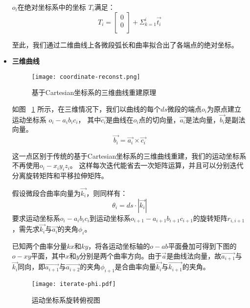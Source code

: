 \begin{itemize}
$o_i$在绝对坐标系中的坐标 $T_i$满足：
    \begin{equation}
    T_i = \left[
    		\begin{matrix}
        0\\
        0\\
      	\end{matrix}
      \right]
      + \Sigma_{k=1} ^ {i} \vec{t_i}
    \end{equation}
    
至此，我们通过二维曲线上各微段弧长和曲率拟合出了各端点的绝对坐标。

\item \textbf{三维曲线} \\

\begin{figure}[H]
\centering
\texttt{[image: coordinate-reconst.png]}
\caption{基于Cartesian坐标系的三维曲线重建原理}
\label{fig:coordinate-reconst} 
\end{figure}


如图 ~\ref{fig:coordinate-reconst} 所示，在三维情况下，我们以曲线的每个$ds$微段的端点$o_i$为原点建立运动坐标系\cite{three-dimensional-curve} $o_i-a_ib_ic_i$，
其中$\vec{c_i}$是曲线在$o_i$点的切向量，$\vec{a_i}$是法向量，$\vec{b_i}$是副法向量。
\begin{equation}
\vec{b_i} = \vec{a_i} \times \vec{c_i}
\end{equation}

这一点区别于传统的基于Cartesian坐标系的三维曲线重建，我们的运动坐标系不再使用$o_i-x_iy_iz_i$。
这样每次迭代能省去一次矩阵运算，并且可以分别迭代分离旋转矩阵和平移拉伸矩阵。

假设微段合曲率向量为$\vec{k_i}$，则同样有：
\begin{equation}
\theta_i = ds\cdot |\vec{k_i}|
\end{equation}
要求运动坐标系$o_i-a_ib_ic_i$到运动坐标系$o_{i+1}-a_{i+1}b_{i+1}c_{i+1}$的旋转矩阵$r_{i, i+1}$，需先求$\vec{k_i}$与$\vec{a_i}$的夹角$\phi_i$。

已知两个曲率分量$kx$和$ky$，将各运动坐标轴的$o-ab$平面叠加可得到下图的$o-xy$平面，其中$x$和$y$分别是两个曲率方向。由于$\vec{a}$是曲线法向量，故$\vec{a_{i+1}}$与$\vec{k_i}$同向，即$\vec{a_{i+1}}$与$\vec{a_{i+2}}$的夹角$\phi_{i+1}$是合曲率向量$\vec{k_i}$与$\vec{k_{i+1}}$的夹角。

\begin{figure}[H]
\centering
\texttt{[image: iterate-phi.pdf]}
\caption{运动坐标系旋转俯视图}
\label{fig:iterate-phi} 
\end{figure}


\end{itemize}
